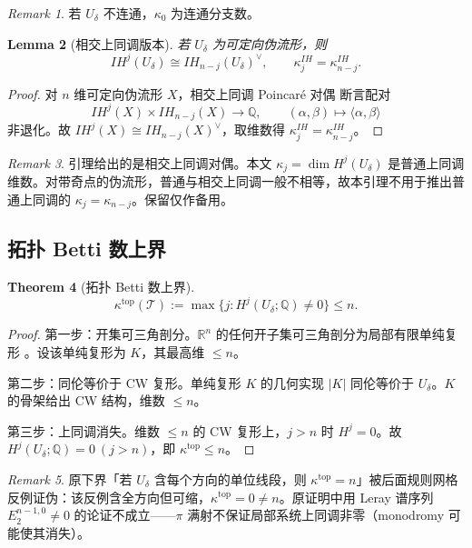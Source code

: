 \documentclass[11pt,a4paper]{article}
\newtheorem{theorem}{Theorem}[section]
\newtheorem{lemma}[theorem]{Lemma}
\theoremstyle{remark}
\newtheorem{remark}[theorem]{Remark}
\begin{document}
	\begin{remark}
		若 $U_\delta$ 不连通，$\kappa_0$ 为连通分支数。
	\end{remark}
	
	\begin{lemma}[相交上同调版本]
		若 $U_\delta$ 为可定向伪流形，则
		\[
		IH^j(U_\delta)\cong IH_{n-j}(U_\delta)^\vee,\qquad \kappa_j^{IH}=\kappa_{n-j}^{IH}.
		\]
	\end{lemma}
	
	\begin{proof}
		对 $n$ 维可定向伪流形 $X$，相交上同调 Poincaré 对偶 \cite{GoreskyMacPherson} 断言配对
		\[
		IH^j(X)\times IH_{n-j}(X)\to\mathbb Q,\qquad(\alpha,\beta)\mapsto\langle\alpha,\beta\rangle
		\]
		非退化。故 $IH^j(X)\cong IH_{n-j}(X)^\vee$，取维数得 $\kappa_j^{IH}=\kappa_{n-j}^{IH}$。
	\end{proof}
	
	\begin{remark}
		引理给出的是相交上同调对偶。本文 $\kappa_j=\dim H^j(U_\delta)$ 是普通上同调维数。对带奇点的伪流形，普通与相交上同调一般不相等，故本引理不用于推出普通上同调的 $\kappa_j=\kappa_{n-j}$。保留仅作备用。
	\end{remark}
	
	\subsection{拓扑 Betti 数上界}
	\begin{theorem}[拓扑 Betti 数上界]
		\label{thm:top-betti-bound}
		\[
		\kappa^{\mathrm{top}}(\mathcal T):=\max\{j:H^j(U_\delta;\mathbb Q)\neq0\}\le n.
		\]
	\end{theorem}
	
	\begin{proof}
		第一步：开集可三角剖分。$\mathbb R^n$ 的任何开子集可三角剖分为局部有限单纯复形 \cite{HatcherAT,MunkresEAT}。设该单纯复形为 $K$，其最高维 $\le n$。
		
		第二步：同伦等价于 CW 复形。单纯复形 $K$ 的几何实现 $|K|$ 同伦等价于 $U_\delta$。$K$ 的骨架给出 CW 结构，维数 $\le n$。
		
		第三步：上同调消失。维数 $\le n$ 的 CW 复形上，$j>n$ 时 $H^j=0$。故 $H^j(U_\delta;\mathbb Q)=0\ (j>n)$，即 $\kappa^{\mathrm{top}}\le n$。
	\end{proof}
	
	\begin{remark}
		原下界「若 $U_\delta$ 含每个方向的单位线段，则 $\kappa^{\mathrm{top}}=n$」被后面规则网格反例证伪：该反例含全方向但可缩，$\kappa^{\mathrm{top}}=0\neq n$。原证明中用 Leray 谱序列 $E_2^{n-1,0}\neq0$ 的论证不成立——$\pi$ 满射不保证局部系统上同调非零（monodromy 可能使其消失）。
	\end{remark}
	
\end{document}
